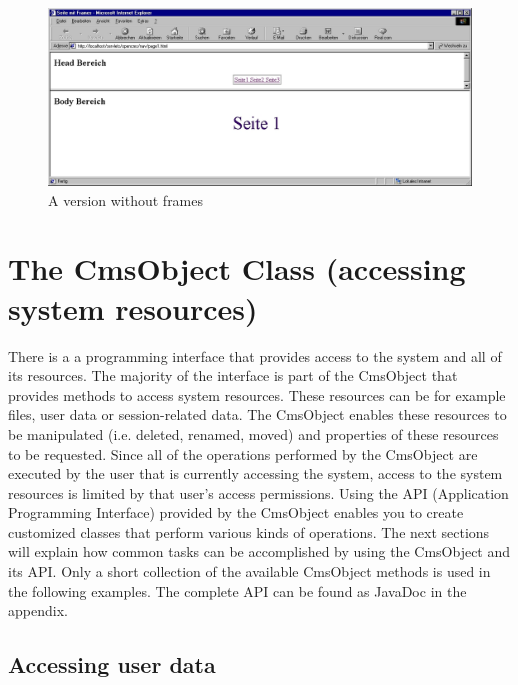 \begin{figure}[hbt]
\begin{center}
\includegraphics[width=\sgw]
                   {pics/templateMech/frames_2}
\caption[A version without frames]
           {A version without frames}
\label{noFrames}
\end{center}
\end{figure}

\section{The CmsObject Class (accessing system resources)}

There is a a programming interface that provides access to the
system and all of its resources. The majority of the interface is part
of the {\name CmsObject} that provides methods to access system resources.
These resources can be for example files, user data or session-related
data. The {\name CmsObject} enables these resources to be manipulated (i.e.
deleted, renamed, moved) and properties of these resources to be
requested. Since all of the operations performed by the {\name CmsObject} are
executed by the user that is currently accessing the system, access to
the system resources is limited by that user's access permissions.
Using the API (Application Programming Interface) provided by the
{\name CmsObject} enables you to create customized classes that perform various
kinds of operations.
The next sections will explain how common tasks can be accomplished by
using the {\name CmsObject} and its API. Only a short collection of the
available {\name CmsObject} methods is used in the following examples. The
complete API can be found as JavaDoc in the appendix.

\subsection{Accessing user data}

